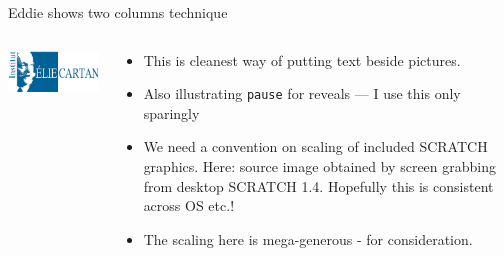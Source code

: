 
\begin{frame}{Eddie shows two columns technique}
\begin{columns}
\begin{column}{0.4\textwidth}
\begin{center}
\includegraphics[scale=0.75]{IECL.png}
\end{center}
\end{column}
\begin{column}{0.6\textwidth}
\begin{itemize}
\item This is cleanest way of putting text beside
pictures. 
\pause\medskip
\item Also illustrating {\tt pause} for reveals --- I 
use this only sparingly
\pause\medskip
\item We need a convention on scaling of included SCRATCH graphics. Here: source image obtained by screen grabbing from desktop SCRATCH 1.4. Hopefully this is consistent across OS etc.! 
\medskip
\item The scaling here is mega-generous - for consideration.
\end{itemize}
\end{column}
\end{columns}
\end{frame}
